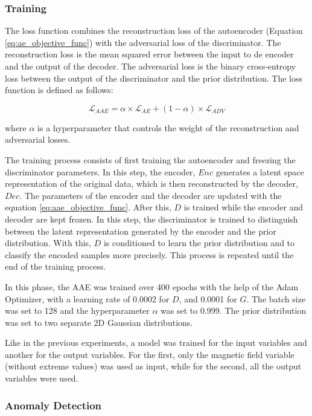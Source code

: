 \subsubsection*{Training}

The loss function combines the reconstruction loss of the autoencoder (Equation \ref{eq:ae_objective_func}) with the adversarial loss of the discriminator. The reconstruction loss is the mean squared error between the input to de encoder and the output of the decoder. The adversarial loss is the binary cross-entropy loss between the output of the discriminator and the prior distribution. The loss function is defined as follows:

\begin{equation}\label{eq:aae_objective_func}
    \mathcal{L}_{AAE} = \alpha \times \mathcal{L}_{AE} + (1-\alpha) \times \mathcal{L}_{ADV}
\end{equation}

where $\alpha$ is a hyperparameter that controls the weight of the reconstruction and adversarial losses.

The training process consists of first training the autoencoder and freezing the discriminator parameters. In this step, the encoder, $Enc$ generates a latent space representation of the original data, which is then reconstructed by the decoder, $Dec$. The parameters of the encoder and the decoder are updated with the equation \ref{eq:aae_objective_func}. After this, $D$ is trained while the encoder and decoder are kept frozen. In this step, the discriminator is trained to distinguish between the latent representation generated by the encoder and the prior distribution. With this, $D$ is conditioned to learn the prior distribution and to classify the encoded samples more precisely. This process is repeated until the end of the training process.

In this phase, the AAE was trained over 400 epochs with the help of the Adam Optimizer, with a learning rate of 0.0002 for $D$, and 0.0001 for $G$. The batch size was set to 128 and the hyperparameter $\alpha$ was set to 0.999. The prior distribution was set to two separate 2D Gaussian distributions. 

Like in the previous experiments, a model was trained for the input variables and another for the output variables. For the first, only the magnetic field variable (without extreme values) was used as input, while for the second, all the output variables were used.

\subsubsection*{Anomaly Detection}

